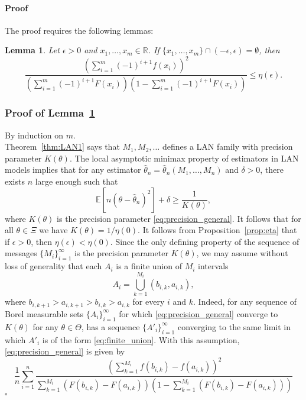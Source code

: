 \documentclass[letterpaper, 10pt]{IEEEtran}      %
\newtheorem{lem}[thm]{\bf {Lemma}}
\newenvironment{proof}{\paragraph*{Proof}}{\hfill$\square$ \newline}
\begin{document}
\begin{proof}
The proof requires the following lemmas:
\begin{lem} \label{lem:eta_epsilon_bound}
Let $\epsilon>0$ and
$x_1,\ldots,x_m \in \mathbb R$. If $\{x_1,\ldots,x_m\} \cap (-\epsilon,\epsilon) = \emptyset$, then 
\[
\frac{ \left( \sum_{i=1}^m (-1)^{i+1} f(x_i) \right)^2}{ \left(\sum_{i=1}^m (-1)^{i+1} F(x_i) \right) \left( 1- \sum_{i=1}^m (-1)^{i+1} F(x_i) \right)} \leq \eta(\epsilon).
\]
\end{lem}
\subsubsection*{Proof of Lemma~\ref{lem:eta_epsilon_bound}}
By induction on $m$. \\

Theorem~\ref{thm:LAN1} says that $M_1,M_2,\ldots$ defines a LAN family with precision parameter $K(\theta)$. The local asymptotic minimax property of estimators in LAN models implies that for any estimator $\hat{\theta}_n =\hat{\theta}_n(M_1,\ldots,M_n)$ and $\delta>0$, there exists $n$ large enough such that 
\[
\mathbb E \left[n(\theta - \hat{\theta}_n)^2  \right] + \delta \geq \frac{1}{K(\theta)} ,
\] 
where $K(\theta)$ is the precision parameter \eqref{eq:precision_general}. It follows that for all $\theta \in \Xi$ we have $K(\theta)=1/\eta(0)$. 
%
%
It follows from Proposition~\ref{prop:eta} that if $\epsilon>0$, then $\eta(\epsilon) < \eta(0)$. Since the only defining property of the sequence of messages $\{M_i\}_{i=1}^\infty$ is the precision parameter $K(\theta)$, we may assume without loss of generality that each $A_i$ is a finite union of $M_i$  intervals
\begin{equation}
\label{eq:finite_union}
A_i = \bigcup_{k=1}^{M_i} (b_{i,k}, a_{i,k}),
\end{equation}
where $b_{i,k+1} > a_{i,k+1} > b_{i,k} > a_{i,k}$ for every $i$ and $k$. Indeed, for any sequence of Borel measurable sets $\{A_i\}_{i=1}^\infty$ for which  \eqref{eq:precision_general} converge to $K(\theta)$ for any $\theta \in \Theta$, has a sequence $\{A'_i\}_{i=1}^\infty$ converging to the same limit in which $A'_i$ is of the form \eqref{eq:finite_union}. With this assumption, \eqref{eq:precision_general} is given by
\begin{equation}
\label{eq:precision_general2}
\frac{1}{n}\sum_{i=1}^n \frac{  \left( \sum_{k=1}^{M_i} f(b_{i,k})-f(a_{i,k}) \right)^2}{ \sum_{k=1}^{M_i} \left( F(b_{i,k})-F(a_{i,k}) \right) \left( 1-\sum_{k=1}^{M_i} \left( F(b_{i,k})-F(a_{i,k}) \right)\right)}

\end{equation}
\end{proof}
\end{document}
